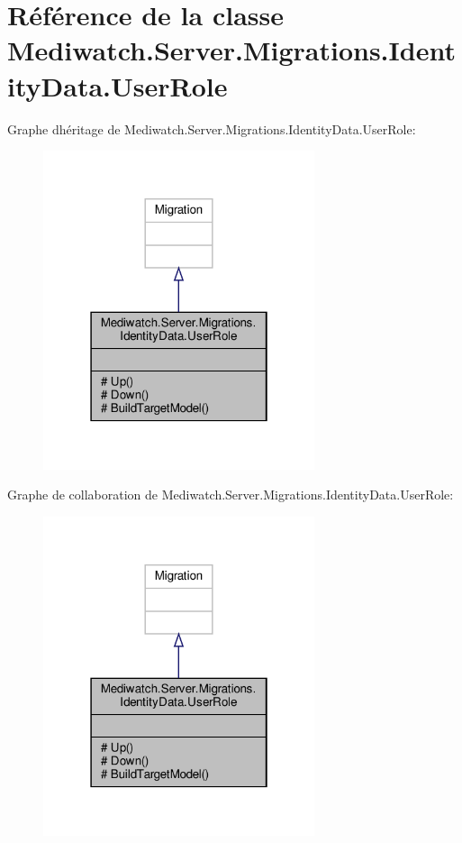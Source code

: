 \hypertarget{class_mediwatch_1_1_server_1_1_migrations_1_1_identity_data_1_1_user_role}{}\section{Référence de la classe Mediwatch.\+Server.\+Migrations.\+Identity\+Data.\+User\+Role}
\label{class_mediwatch_1_1_server_1_1_migrations_1_1_identity_data_1_1_user_role}


Graphe d\textquotesingle{}héritage de Mediwatch.\+Server.\+Migrations.\+Identity\+Data.\+User\+Role\+:
\nopagebreak
\begin{figure}[H]
\begin{center}
\leavevmode
\includegraphics[width=226pt]{class_mediwatch_1_1_server_1_1_migrations_1_1_identity_data_1_1_user_role__inherit__graph}
\end{center}
\end{figure}


Graphe de collaboration de Mediwatch.\+Server.\+Migrations.\+Identity\+Data.\+User\+Role\+:
\nopagebreak
\begin{figure}[H]
\begin{center}
\leavevmode
\includegraphics[width=226pt]{class_mediwatch_1_1_server_1_1_migrations_1_1_identity_data_1_1_user_role__coll__graph}
\end{center}
\end{figure}
